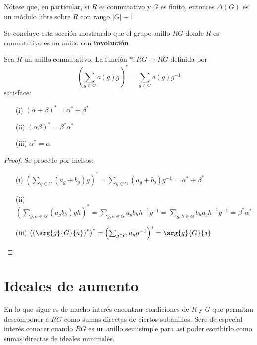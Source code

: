 Nótese que, en particular, si $R$ es conmutativo y $G$ es finito, entonces $\Delta (G)$ es un módulo libre sobre $R$ con rango $|G|-1$

Se concluye esta sección mostrando que el grupo-anillo $RG$ donde $R$ es conmutativo es un anillo con \textbf{involución}

\begin{proposicion}
Sea $R$ un anillo conmutativo. La función $* \colon RG \to RG$ definida por 
\begin{equation}
\left(\sum_{g \in G}a(g)g\right)^* = \sum_{g \in G} a(g) g^{-1}
\end{equation}
satisface: 

\begin{itemize}
\item[(i)] $(\alpha + \beta)^* = \alpha^* + \beta^*$
\item[(ii)] $(\alpha\beta)^* = \beta^*\alpha^*$
\item[(iii)] $\alpha^* = \alpha$
\end{itemize}
\end{proposicion}


\begin{proof}
Se procede por incisos:
\begin{itemize}
\item[(i)] $\left( \sum_{g \in G} (a_g +b_g)g\right)^* =  \sum_{g \in G} (a_g +b_g)g^{-1} = \alpha^* + \beta^*$
\item[(ii)]  $\left( \sum_{g, h \in G} (a_gb_h)gh\right)^* = \sum_{g,h \in G} a_gb_hh^{-1}g^{-1} = \sum_{g,h \in G} b_h a_g h^{-1}g^{-1} = \beta^*\alpha^*$
\item[(iii)]  $\left(\left( \srg{g}{G}{a}\right)^*\right)^* = \left(\sum_{g\in G}a_gg^{-1}\right)^* = \srg{g}{G}{a}$ \qedhere
\end{itemize}
\end{proof}


\section{Ideales de aumento}

En lo que sigue es de mucho interés encontrar condiciones de $R$ y $G$ que permitan descomponer a $RG$ como sumas directas de ciertos subanillos. Será de especial interés conocer cuando $RG$ es un anillo semisimple para así poder escribirlo como sumas directas de ideales minimales. \\



